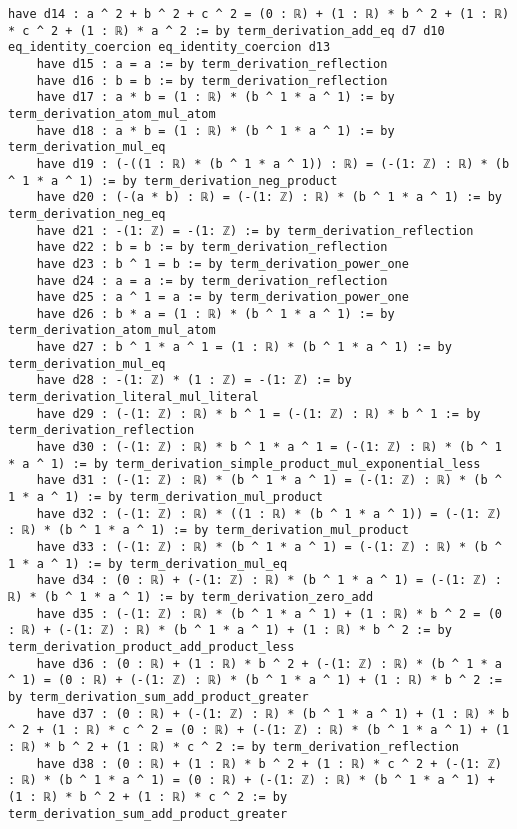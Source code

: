 \documentclass{article}
\begin{document}
\begin{tcolorbox}[colback=white!10, width=\linewidth]
\begin{lstlisting}[language=Lean4]
    have d14 : a ^ 2 + b ^ 2 + c ^ 2 = (0 : ℝ) + (1 : ℝ) * b ^ 2 + (1 : ℝ) * c ^ 2 + (1 : ℝ) * a ^ 2 := by term_derivation_add_eq d7 d10 eq_identity_coercion eq_identity_coercion d13
    have d15 : a = a := by term_derivation_reflection
    have d16 : b = b := by term_derivation_reflection
    have d17 : a * b = (1 : ℝ) * (b ^ 1 * a ^ 1) := by term_derivation_atom_mul_atom
    have d18 : a * b = (1 : ℝ) * (b ^ 1 * a ^ 1) := by term_derivation_mul_eq
    have d19 : (-((1 : ℝ) * (b ^ 1 * a ^ 1)) : ℝ) = (-(1: ℤ) : ℝ) * (b ^ 1 * a ^ 1) := by term_derivation_neg_product
    have d20 : (-(a * b) : ℝ) = (-(1: ℤ) : ℝ) * (b ^ 1 * a ^ 1) := by term_derivation_neg_eq
    have d21 : -(1: ℤ) = -(1: ℤ) := by term_derivation_reflection
    have d22 : b = b := by term_derivation_reflection
    have d23 : b ^ 1 = b := by term_derivation_power_one
    have d24 : a = a := by term_derivation_reflection
    have d25 : a ^ 1 = a := by term_derivation_power_one
    have d26 : b * a = (1 : ℝ) * (b ^ 1 * a ^ 1) := by term_derivation_atom_mul_atom
    have d27 : b ^ 1 * a ^ 1 = (1 : ℝ) * (b ^ 1 * a ^ 1) := by term_derivation_mul_eq
    have d28 : -(1: ℤ) * (1 : ℤ) = -(1: ℤ) := by term_derivation_literal_mul_literal
    have d29 : (-(1: ℤ) : ℝ) * b ^ 1 = (-(1: ℤ) : ℝ) * b ^ 1 := by term_derivation_reflection
    have d30 : (-(1: ℤ) : ℝ) * b ^ 1 * a ^ 1 = (-(1: ℤ) : ℝ) * (b ^ 1 * a ^ 1) := by term_derivation_simple_product_mul_exponential_less
    have d31 : (-(1: ℤ) : ℝ) * (b ^ 1 * a ^ 1) = (-(1: ℤ) : ℝ) * (b ^ 1 * a ^ 1) := by term_derivation_mul_product
    have d32 : (-(1: ℤ) : ℝ) * ((1 : ℝ) * (b ^ 1 * a ^ 1)) = (-(1: ℤ) : ℝ) * (b ^ 1 * a ^ 1) := by term_derivation_mul_product
    have d33 : (-(1: ℤ) : ℝ) * (b ^ 1 * a ^ 1) = (-(1: ℤ) : ℝ) * (b ^ 1 * a ^ 1) := by term_derivation_mul_eq
    have d34 : (0 : ℝ) + (-(1: ℤ) : ℝ) * (b ^ 1 * a ^ 1) = (-(1: ℤ) : ℝ) * (b ^ 1 * a ^ 1) := by term_derivation_zero_add
    have d35 : (-(1: ℤ) : ℝ) * (b ^ 1 * a ^ 1) + (1 : ℝ) * b ^ 2 = (0 : ℝ) + (-(1: ℤ) : ℝ) * (b ^ 1 * a ^ 1) + (1 : ℝ) * b ^ 2 := by term_derivation_product_add_product_less
    have d36 : (0 : ℝ) + (1 : ℝ) * b ^ 2 + (-(1: ℤ) : ℝ) * (b ^ 1 * a ^ 1) = (0 : ℝ) + (-(1: ℤ) : ℝ) * (b ^ 1 * a ^ 1) + (1 : ℝ) * b ^ 2 := by term_derivation_sum_add_product_greater
    have d37 : (0 : ℝ) + (-(1: ℤ) : ℝ) * (b ^ 1 * a ^ 1) + (1 : ℝ) * b ^ 2 + (1 : ℝ) * c ^ 2 = (0 : ℝ) + (-(1: ℤ) : ℝ) * (b ^ 1 * a ^ 1) + (1 : ℝ) * b ^ 2 + (1 : ℝ) * c ^ 2 := by term_derivation_reflection
    have d38 : (0 : ℝ) + (1 : ℝ) * b ^ 2 + (1 : ℝ) * c ^ 2 + (-(1: ℤ) : ℝ) * (b ^ 1 * a ^ 1) = (0 : ℝ) + (-(1: ℤ) : ℝ) * (b ^ 1 * a ^ 1) + (1 : ℝ) * b ^ 2 + (1 : ℝ) * c ^ 2 := by term_derivation_sum_add_product_greater

\end{lstlisting}
\end{tcolorbox}
\end{document}
